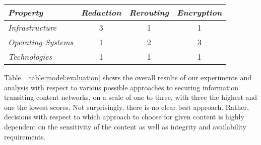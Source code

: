 \begin{table*}[tp] %
\centering %
\begin{tabular}{lccc}
\toprule %
{\it Property}			& {\it Redaction}	& {\it Rerouting} 	& {\it Encryption} 	\\\toprule
{\it Infrastructure} 	& 3				  	& 1					& 1				 	\\\midrule
{\it Operating Systems}	& 1					& 2					& 3 				\\\midrule
{\it Technologies}		& 1					& 1					& 1					\\\bottomrule
\end{tabular}
\caption{Approach Evaluation Summary}
\label{table:model:evaluation}
\end{table*}

Table ~\ref{table:model:evaluation} shows the overall results of our experiments and analysis with respect to various possible approaches to securing information transiting content networks, on a scale of one to three, with three the highest and one the lowest scores.  Not surprisingly, there is no clear best approach.  Rather, decisions with respect to which approach to choose for given content is highly dependent on the sensitivity of the content as well as integrity and availability requirements.